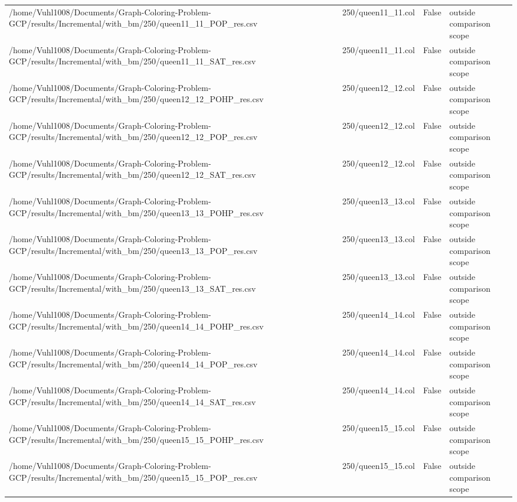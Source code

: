 \begin{table}[htbp]
\begin{tabular}{llll}
/home/Vuhl1008/Documents/Graph-Coloring-Problem-GCP/results/Incremental/with\_bm/250/queen11\_11\_POP\_res.csv & 250/queen11\_11.col & False & outside comparison scope \\
/home/Vuhl1008/Documents/Graph-Coloring-Problem-GCP/results/Incremental/with\_bm/250/queen11\_11\_SAT\_res.csv & 250/queen11\_11.col & False & outside comparison scope \\
/home/Vuhl1008/Documents/Graph-Coloring-Problem-GCP/results/Incremental/with\_bm/250/queen12\_12\_POHP\_res.csv & 250/queen12\_12.col & False & outside comparison scope \\
/home/Vuhl1008/Documents/Graph-Coloring-Problem-GCP/results/Incremental/with\_bm/250/queen12\_12\_POP\_res.csv & 250/queen12\_12.col & False & outside comparison scope \\
/home/Vuhl1008/Documents/Graph-Coloring-Problem-GCP/results/Incremental/with\_bm/250/queen12\_12\_SAT\_res.csv & 250/queen12\_12.col & False & outside comparison scope \\
/home/Vuhl1008/Documents/Graph-Coloring-Problem-GCP/results/Incremental/with\_bm/250/queen13\_13\_POHP\_res.csv & 250/queen13\_13.col & False & outside comparison scope \\
/home/Vuhl1008/Documents/Graph-Coloring-Problem-GCP/results/Incremental/with\_bm/250/queen13\_13\_POP\_res.csv & 250/queen13\_13.col & False & outside comparison scope \\
/home/Vuhl1008/Documents/Graph-Coloring-Problem-GCP/results/Incremental/with\_bm/250/queen13\_13\_SAT\_res.csv & 250/queen13\_13.col & False & outside comparison scope \\
/home/Vuhl1008/Documents/Graph-Coloring-Problem-GCP/results/Incremental/with\_bm/250/queen14\_14\_POHP\_res.csv & 250/queen14\_14.col & False & outside comparison scope \\
/home/Vuhl1008/Documents/Graph-Coloring-Problem-GCP/results/Incremental/with\_bm/250/queen14\_14\_POP\_res.csv & 250/queen14\_14.col & False & outside comparison scope \\
/home/Vuhl1008/Documents/Graph-Coloring-Problem-GCP/results/Incremental/with\_bm/250/queen14\_14\_SAT\_res.csv & 250/queen14\_14.col & False & outside comparison scope \\
/home/Vuhl1008/Documents/Graph-Coloring-Problem-GCP/results/Incremental/with\_bm/250/queen15\_15\_POHP\_res.csv & 250/queen15\_15.col & False & outside comparison scope \\
/home/Vuhl1008/Documents/Graph-Coloring-Problem-GCP/results/Incremental/with\_bm/250/queen15\_15\_POP\_res.csv & 250/queen15\_15.col & False & outside comparison scope \\

\end{tabular}
\end{table}
